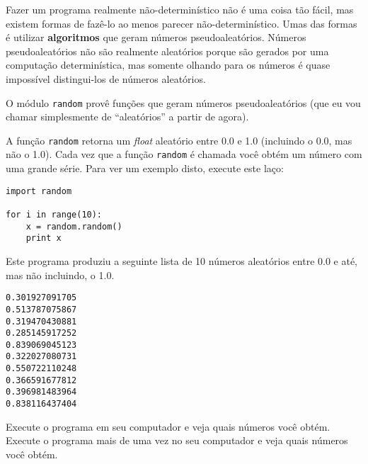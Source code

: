 Fazer um programa realmente não-determinístico não é uma coisa tão fácil, mas
existem formas de fazê-lo ao menos parecer não-determinístico. Umas das formas
é utilizar {\bf algoritmos} que geram números pseudoaleatórios. Números
pseudoaleatórios não são realmente aleatórios porque são gerados por uma
computação determinística, mas somente olhando para os números é quase
impossível distingui-los de números aleatórios.



O módulo {\tt random} provê funções que geram números pseudoaleatórios (que
eu vou chamar simplesmente de ``aleatórios'' a partir de agora).



A função {\tt random} retorna um {\it float} aleatório entre 0.0 e 1.0
(incluindo o 0.0, mas não o 1.0). Cada vez que a função {\tt random} é chamada
você obtém um número com uma grande série. Para ver um exemplo disto, execute
este laço:

\beforeverb
\begin{verbatim}
import random

for i in range(10):
    x = random.random()
    print x
\end{verbatim}
\afterverb
%
%
Este programa produziu a seguinte lista de 10 números aleatórios entre 0.0
e até, mas não incluindo, o 1.0.

\beforeverb
\begin{verbatim}
0.301927091705
0.513787075867
0.319470430881
0.285145917252
0.839069045123
0.322027080731
0.550722110248
0.366591677812
0.396981483964
0.838116437404
\end{verbatim}
\afterverb
%
\begin{ex}
Execute o programa em seu computador e veja quais números você obtém.
Execute o programa mais de uma vez no seu computador e veja quais números você obtém.
\end{ex}

